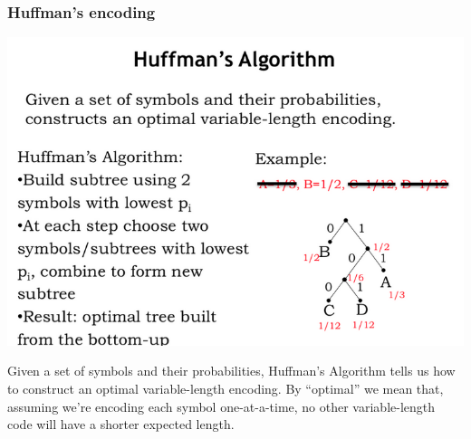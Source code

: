 \documentclass[a4paper,twoside]{article}
\numberwithin{equation}{section}
\begin{document}
\subsubsection{Huffman's encoding}
\begin{center}
    \includegraphics[scale=0.3]{assets/huffman.png}
\end{center}
Given a set of symbols and their probabilities, Huffman's Algorithm tells us how to construct an
optimal variable-length encoding. By “optimal” we mean that, assuming we're encoding each symbol
 one-at-a-time, no other variable-length code will have a shorter expected length.
\end{document}

